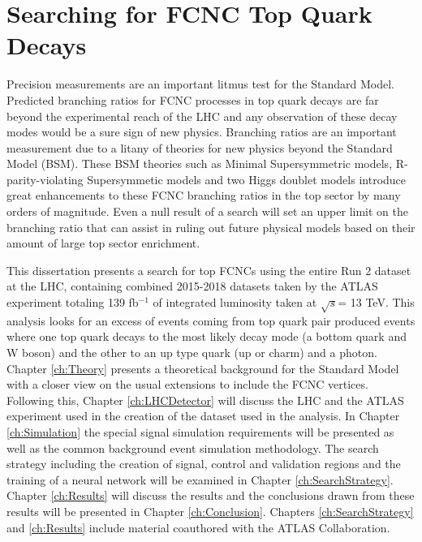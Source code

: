 \section{Searching for FCNC Top Quark Decays}
Precision measurements are an important litmus test for the Standard Model.  Predicted branching ratios for FCNC processes in top quark decays are far beyond the experimental reach of the LHC and any observation of these decay modes would be a sure sign of new physics.  Branching ratios are an important measurement due to a litany of theories for new physics beyond the Standard Model (BSM).  These BSM theories  such as Minimal Supersymmetric models\cite{MSSM}, R-parity-violating Supersymmetic models\cite{RPVSUSY} and two Higgs doublet models\cite{2HDM} introduce great enhancements to these FCNC branching ratios in the top sector by many orders of magnitude.  Even a null result of a search will set an upper limit on the branching ratio that can assist in ruling out future physical models based on their amount of large top sector enrichment.

This dissertation presents a search for top FCNCs using the entire Run 2 dataset at the LHC, containing combined 2015-2018 datasets taken by the ATLAS experiment totaling 139 fb$^{-1}$ of integrated luminosity taken at $\sqrt{s}$= 13 TeV.  This analysis looks for an excess of events coming from top quark pair produced events where one top quark decays to the most likely decay mode (a bottom quark and W boson) and the other to an up type quark (up or charm) and a photon. Chapter \ref{ch:Theory} presents a theoretical background for the Standard Model with a closer view on the usual extensions to include the FCNC vertices.  Following this,  Chapter \ref{ch:LHCDetector} will discuss the LHC and the ATLAS experiment used in the creation of the dataset used in the analysis.  In Chapter \ref{ch:Simulation} the special signal simulation requirements will be presented as well as the common background event simulation methodology.  The search strategy including the creation of signal, control and validation regions and the training of a neural network will be examined in Chapter \ref{ch:SearchStrategy}.  Chapter \ref{ch:Results} will discuss the results and the conclusions drawn from these results will be presented in Chapter \ref{ch:Conclusion}.  Chapters \ref{ch:SearchStrategy} and \ref{ch:Results} include material coauthored with the ATLAS Collaboration.